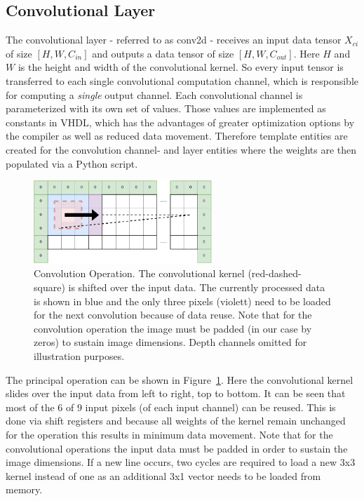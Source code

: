 \subsection{Convolutional Layer}

The convolutional layer - referred to as conv2d - receives an input data tensor $X_{ci} $ of size $[H, W, C_{in}]$ and outputs a data tensor of size $[H,W,C_{out}]$. Here $H$ and $W$ is the height and width of the convolutional kernel. So every input tensor is transferred to each single convolutional computation channel, which is responsible for computing a \emph{single} output channel. Each convolutional channel is parameterized with its own set of values. Those values are implemented as constants in VHDL, which has the advantages of greater optimization options by the compiler as well as reduced data movement. Therefore template entities are created for the convolution channel- and layer entities where the weights are then populated via a Python script.

\begin{figure}[hb]
	\centering
	\includegraphics[width=0.6\textwidth]{img/convolution.pdf}
	\caption[Convolution Operation]{Convolution Operation. The convolutional kernel (red-dashed-square) is shifted over the input data. The currently processed data is shown in blue and the only three pixels (violett) need to be loaded for the next convolution because of data reuse. Note that for the convolution operation the image must be padded (in our case by zeros) to sustain image dimensions. Depth channels omitted for illustration purposes.}
	\label{fig:hw-conv-operation}
\end{figure}

The principal operation can be shown in Figure~\ref{fig:hw-conv-operation}. Here the convolutional kernel slides over the input data from left to right, top to bottom. It can be seen that most of the $6$ of $9$ input pixels (of each input channel) can be reused. This is done via shift registers and because all weights of the kernel remain unchanged for the operation this results in minimum data movement. Note that for the convolutional operations the input data must be padded in order to sustain the image dimensions. If a new line occurs, two cycles are required to load a new 3x3 kernel instead of one as an additional 3x1 vector needs to be loaded from memory. 


